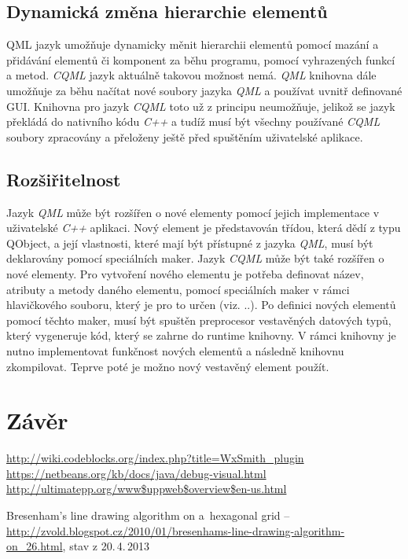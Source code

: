 \documentclass[11pt,twoside,a4paper]{book}
\begin{document}
{{\begin{ttemize}
{{\begin{lastlisting}[frame=single,caption=Řešení v pseudokódu problematického použití operátoru "." v přiřazovacím výroku,label=lst:var0N]
{{\subsection{Dynamická změna hierarchie elementů}
QML jazyk umožňuje dynamicky měnit hierarchii elementů pomocí mazání a přidávání elementů či komponent za běhu programu, pomocí vyhrazených funkcí a metod. \textit{CQML} jazyk aktuálně takovou možnost nemá. \textit{QML} knihovna dále umožňuje za běhu načítat nové soubory jazyka \textit{QML} a používat uvnitř definované GUI. Knihovna pro jazyk \textit{CQML} toto už z principu neumožňuje, jelikož se jazyk překládá do nativního kódu \textit{C++} a tudíž musí být všechny používané \textit{CQML} soubory zpracovány a přeloženy ještě před spuštěním uživatelské aplikace.
\subsection{Rozšiřitelnost}
Jazyk \textit{QML} může být rozšířen o nové elementy pomocí jejich implementace v uživatelské \textit{C++} aplikaci. Nový element je představován třídou, která dědí z typu QObject, a její vlastnosti, které mají být přístupné z jazyka \textit{QML}, musí být deklarovány pomocí speciálních maker. 
Jazyk \textit{CQML} může být také rozšířen o nové elementy. Pro vytvoření nového elementu je potřeba definovat název, atributy a metody daného elementu, pomocí speciálních maker v rámci hlavičkového souboru, který je pro to určen (viz. ..). Po definici nových elementů pomocí těchto maker, musí být spuštěn preprocesor vestavěných datových typů, který vygeneruje kód, který se zahrne do runtime knihovny. V rámci knihovny je nutno implementovat funkčnost nových elementů a následně knihovnu zkompilovat. Teprve poté je možno nový vestavěný element použít.


\section{Závěr}




\begin{thebibliography}{99}
 \url{http://wiki.codeblocks.org/index.php?title=WxSmith_plugin}
 \url{https://netbeans.org/kb/docs/java/debug-visual.html}
 \url{http://ultimatepp.org/www$uppweb$overview$en-us.html}

 Bresenham's line drawing algorithm on a~hexagonal grid -- \url{http://zvold.blogspot.cz/2010/01/bresenhams-line-drawing-algorithm-on_26.html}, stav z 20.\,4.\,2013



\end{thebibliography}}}
\end{lastlisting}}}
\end{ttemize}}}
\end{document}
